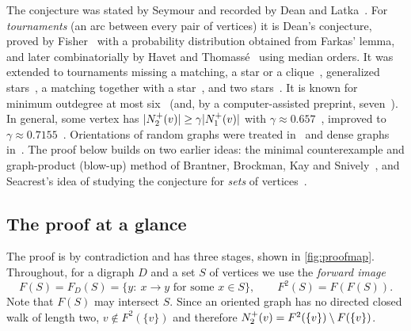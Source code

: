The conjecture was stated by Seymour and recorded by Dean and
Latka~\cite{DeanLatka1995}. For \emph{tournaments} (an arc between every
pair of vertices) it is Dean's conjecture, proved by
Fisher~\cite{Fisher1996} with a probability distribution obtained from
Farkas' lemma, and later combinatorially by Havet and
Thomass\'e~\cite{HavetThomasse2000} using median orders. It was extended
to tournaments missing a matching, a star or a
clique~\cite{FidlerYuster2007}, generalized stars~\cite{Ghazal2012},
a matching together with a star~\cite{DaraFrancisJacobNarayanan2022}, and
two stars~\cite{DaamouchAlMninyGhazal2025}. It is known for minimum
outdegree at most six~\cite{KanekoLocke2001} (and, by a computer-assisted
preprint, seven~\cite{SadhukhanSandeepSen2026}). In general, some vertex has
$\lvert N^+_2(v)\rvert\ge\gamma\lvert N^+_1(v)\rvert$ with
$\gamma\approx0.657$~\cite{ChenShenYuster2003}, improved to
$\gamma\approx0.7155$~\cite{HuangPeng2024}. Orientations of random graphs
were treated in~\cite{BotlerMouraNaia2023,EspunyDiazEtAl2025} and dense
graphs in~\cite{Brukhman2026}.
The proof below builds on two earlier ideas: the minimal counterexample and
graph-product (blow-up) method of Brantner, Brockman, Kay and
Snively~\cite{BrantnerBrockmanKaySnively2009}, and Seacrest's idea of
studying the conjecture for \emph{sets} of vertices~\cite{Seacrest2019}.

\subsection{The proof at a glance}\label{sec:glance}

The proof is by contradiction and has three stages, shown in
\cref{fig:proofmap}. Throughout, for a digraph $D$ and a set $S$ of
vertices we use the \emph{forward image}
\[
 F(S)=F_D(S)=\{y:\ x\to y \text{ for some } x\in S\},\qquad F^2(S)=F(F(S)).
\]
Note that $F(S)$ may intersect $S$. Since an oriented graph has no
directed closed walk of length two, $v\notin F^2(\{v\})$ and therefore
$N^+_2(v)=F^2(\{v\})\setminus F(\{v\})$.

